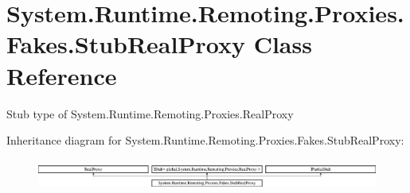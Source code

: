 \hypertarget{class_system_1_1_runtime_1_1_remoting_1_1_proxies_1_1_fakes_1_1_stub_real_proxy}{\section{System.\-Runtime.\-Remoting.\-Proxies.\-Fakes.\-Stub\-Real\-Proxy Class Reference}
\label{class_system_1_1_runtime_1_1_remoting_1_1_proxies_1_1_fakes_1_1_stub_real_proxy}
}


Stub type of System.\-Runtime.\-Remoting.\-Proxies.\-Real\-Proxy 


Inheritance diagram for System.\-Runtime.\-Remoting.\-Proxies.\-Fakes.\-Stub\-Real\-Proxy\-:\begin{figure}[H]
\begin{center}
\leavevmode
\includegraphics[height=1.034164cm]{class_system_1_1_runtime_1_1_remoting_1_1_proxies_1_1_fakes_1_1_stub_real_proxy}
\end{center}
\end{figure}
